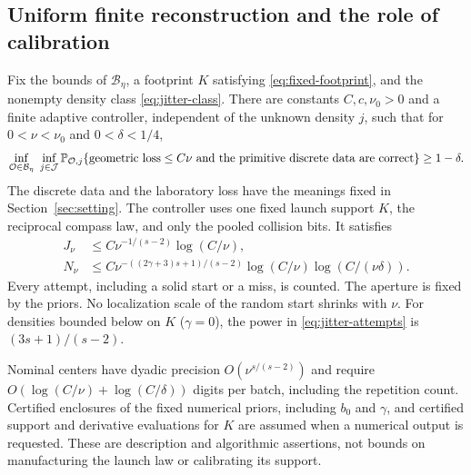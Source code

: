 \subsection{Uniform finite reconstruction and the role of calibration}
\begin{theorem}
\label{thm:stationary-jitter}
Fix the bounds of $\mathcal B_\eta$, a footprint $K$ satisfying
\eqref{eq:fixed-footprint}, and the nonempty density class
\eqref{eq:jitter-class}. There are constants $C,c,\nu_0>0$ and a finite
adaptive controller, independent of the unknown density $j$, such that
for $0<\nu<\nu_0$ and $0<\delta<1/4$,
\begin{equation}\label{eq:jitter-uniform-quantifier}
 \inf_{\mathcal O\in\mathcal B_\eta}\ \inf_{j\in\mathcal J}
 \mathbb P_{\mathcal O,j}\{\text{geometric loss}\le C\nu
              \text{ and the primitive discrete data are correct}\}
                         \ge1-\delta.
\end{equation}
The discrete data and the laboratory loss have the meanings fixed in
Section~\ref{sec:setting}. The controller uses one fixed launch support
$K$, the reciprocal compass law, and only the pooled collision bits.
It satisfies
\begin{align}
 J_\nu&\le C\nu^{-1/(s-2)}\log(C/\nu),\label{eq:jitter-centers}\\
 N_\nu&\le C\nu^{-((2\gamma+3)s+1)/(s-2)}
                  \log(C/\nu)\log(C/(\nu\delta)).\label{eq:jitter-attempts}
\end{align}
Every attempt, including a solid start or a miss, is counted. The
aperture is fixed by the priors. No localization scale of the random
start shrinks with $\nu$. For densities bounded below on $K$
($\gamma=0$), the power in \eqref{eq:jitter-attempts} is
$(3s+1)/(s-2)$.

Nominal centers have dyadic precision $O(\nu^{s/(s-2)})$ and require
$O(\log(C/\nu)+\log(C/\delta))$ digits per batch, including the
repetition count. Certified enclosures of the fixed numerical priors, including $b_0$
and $\gamma$, and certified support and derivative evaluations for $K$
are assumed when a numerical output is requested.
These are description and algorithmic assertions, not bounds on
manufacturing the launch law or calibrating its support.
\end{theorem}
